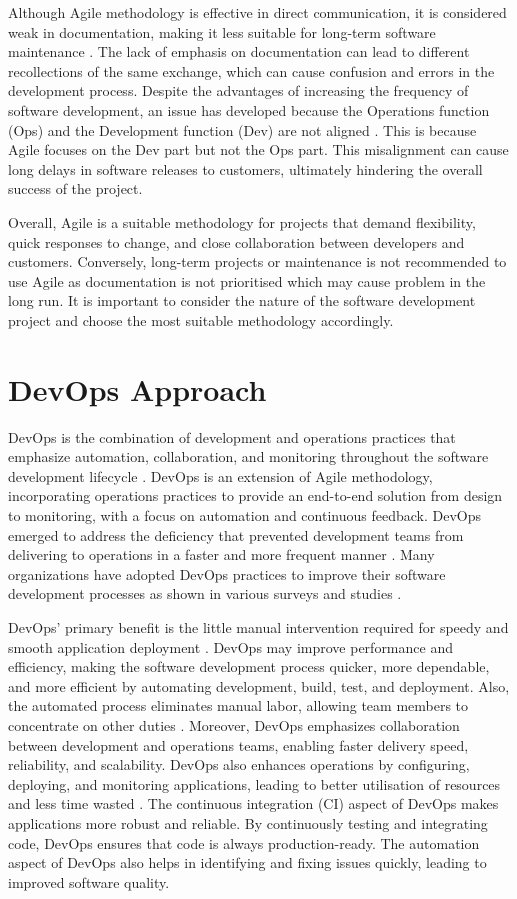 Although Agile methodology is effective in direct communication, it is considered weak in documentation, making it less suitable for long-term software maintenance \cite{aaa, koch}. The lack of emphasis on documentation can lead to different recollections of the same exchange, which can cause confusion and errors in the development process. Despite the advantages of increasing the frequency of software development, an issue has developed because the Operations function (Ops) and the Development function (Dev) are not aligned \cite{hlrf}. This is because Agile focuses on the Dev part but not the Ops part. This misalignment can cause long delays in software releases to customers, ultimately hindering the overall success of the project.

Overall, Agile is a suitable methodology for projects that demand flexibility, quick responses to change, and close collaboration between developers and customers. Conversely, long-term projects or maintenance is not recommended to use Agile as documentation is not prioritised which may cause problem in the long run. It is important to consider the nature of the software development project and choose the most suitable methodology accordingly. 

\section{DevOps Approach}
DevOps is the combination of development and operations practices that emphasize automation, collaboration, and monitoring throughout the software development lifecycle \cite{joakim}. DevOps is an extension of Agile methodology, incorporating operations practices to provide an end-to-end solution from design to monitoring, with a focus on automation and continuous feedback. DevOps emerged to address the deficiency that prevented development teams from delivering to operations in a faster and more frequent manner \cite{hlrf}. Many organizations have adopted DevOps practices to improve their software development processes as shown in various surveys and studies \cite{spj}.

DevOps' primary benefit is the little manual intervention required for speedy and smooth application deployment \cite{spj}. DevOps may improve performance and efficiency, making the software development process quicker, more dependable, and more efficient by automating development, build, test, and deployment. Also, the automated process eliminates manual labor, allowing team members to concentrate on other duties \cite{joakim}. Moreover, DevOps emphasizes collaboration between development and operations teams, enabling faster delivery speed, reliability, and scalability. DevOps also enhances operations by configuring, deploying, and monitoring applications, leading to better utilisation of resources and less time wasted \cite{os}. The continuous integration (CI) aspect of DevOps makes applications more robust and reliable. By continuously testing and integrating code, DevOps ensures that code is always production-ready. The automation aspect of DevOps also helps in identifying and fixing issues quickly, leading to improved software quality.

